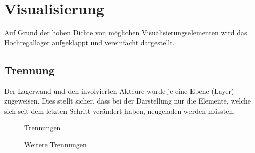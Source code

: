 \section{Visualisierung}
Auf Grund der hohen Dichte von möglichen Visualisierungselementen wird das Hochregallager aufgeklappt und vereinfacht dargestellt.
%
\subsection{Trennung}
Der Lagerwand und den involvierten Akteure wurde je eine Ebene (Layer) zugeweisen. Dies stellt sicher, dass bei der Darstellung nur die Elemente, welche sich seit dem letzten Schritt verändert haben, neugeladen werden müssten.  

%
\begin{figure}[h]
\hfill
{}\hfill
{}
\caption{Trennungen}
\end{figure}

\begin{figure}[h]
\hfill
{}
\caption{Weitere Trennungen}
\end{figure}
%

